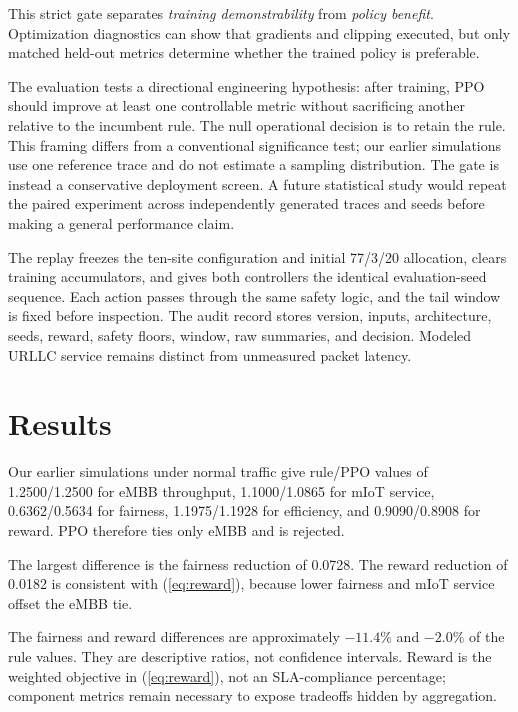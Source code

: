 \documentclass[conference]{IEEEtran}
\begin{document}
This strict gate separates \emph{training demonstrability} from \emph{policy benefit}. Optimization diagnostics can show that gradients and clipping executed, but only matched held-out metrics determine whether the trained policy is preferable.

The evaluation tests a directional engineering hypothesis: after training, PPO should improve at least one controllable metric without sacrificing another relative to the incumbent rule. The null operational decision is to retain the rule. This framing differs from a conventional significance test; our earlier simulations use one reference trace and do not estimate a sampling distribution. The gate is instead a conservative deployment screen. A future statistical study would repeat the paired experiment across independently generated traces and seeds before making a general performance claim.

The replay freezes the ten-site configuration and initial 77/3/20 allocation, clears training accumulators, and gives both controllers the identical evaluation-seed sequence. Each action passes through the same safety logic, and the tail window is fixed before inspection. The audit record stores version, inputs, architecture, seeds, reward, safety floors, window, raw summaries, and decision. Modeled URLLC service remains distinct from unmeasured packet latency.

\section{Results}
Our earlier simulations under normal traffic give rule/PPO values of 1.2500/1.2500 for eMBB throughput, 1.1000/1.0865 for mIoT service, 0.6362/0.5634 for fairness, 1.1975/1.1928 for efficiency, and 0.9090/0.8908 for reward. PPO therefore ties only eMBB and is rejected.

The largest difference is the fairness reduction of 0.0728. The reward reduction of 0.0182 is consistent with (\ref{eq:reward}), because lower fairness and mIoT service offset the eMBB tie.

The fairness and reward differences are approximately $-11.4\%$ and $-2.0\%$ of the rule values. They are descriptive ratios, not confidence intervals. Reward is the weighted objective in (\ref{eq:reward}), not an SLA-compliance percentage; component metrics remain necessary to expose tradeoffs hidden by aggregation.
\end{document}
